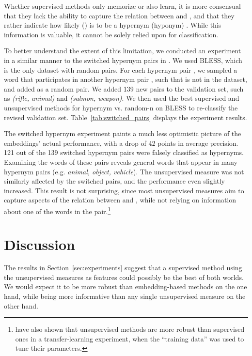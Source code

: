 \documentclass[11pt]{article}
\begin{document}
Whether supervised methods only memorize or also learn, it is more consensual that they lack the ability to capture the relation between  and , and that they rather indicate how likely  () is to be a hypernym (hyponym) \cite{levy2015supervised,santus2016nine,shwartz2016improving,roller2016relations}. While this information is valuable, it cannot be solely relied upon for classification. 

To better understand the extent of this limitation, we conducted an experiment in a similar manner to the switched hypernym pairs in . We used BLESS, which is the only dataset with random pairs. For each hypernym pair , we sampled a word  that participates in another hypernym pair , such that  is not in the dataset, and added  as a random pair. We added 139 new pairs to the validation set, such as \emph{(rifle, animal)} and \emph{(salmon, weapon)}. We then used the best supervised and unsupervised methods for hypernym vs. random-n on BLESS to re-classify the revised validation set. Table~\ref{tab:switched_pairs} displays the experiment results. 

The switched hypernym experiment paints a much less optimistic picture of the embeddings' actual performance, with a drop of 42 points in average precision. 121 out of the 139 switched hypernym pairs were falsely classified as hypernyms. Examining the  words of these pairs reveals general words that appear in many hypernym pairs (e.g. \emph{animal, object, vehicle}).  The unsupervised measure was not similarly affected by the switched pairs, and the performance even slightly increased. This result is not surprising, since most unsupervised measures aim to capture aspects of the relation between  and , while not relying on information about one of the words in the pair.\footnote{ have also shown that unsupervised methods are more robust than supervised ones in a transfer-learning experiment, when the ``training data'' was used to tune their parameters.}



\section{Discussion}
\label{sec:discussion}

The results in Section~\ref{sec:experiments} suggest that a supervised method using the unsupervised measures as features could possibly be the best of both worlds. We would expect it to be more robust than embedding-based methods on the one hand, while being more informative than any single unsupervised measure on the other hand. 
\end{document}
